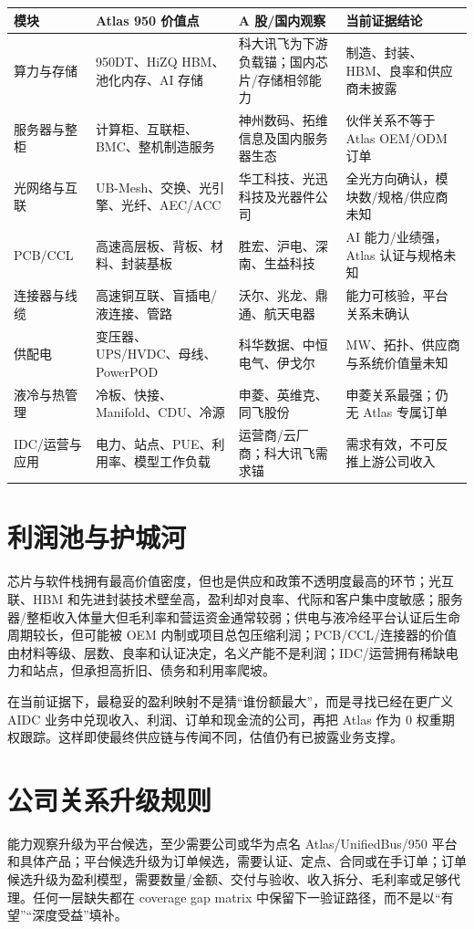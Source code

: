 \begin{exhibitbox}
\begin{longtable}{L{2.8cm}L{3.5cm}L{4.0cm}L{3.0cm}}
\toprule
\textbf{模块} & \textbf{Atlas 950 价值点} & \textbf{A 股/国内观察} & \textbf{当前证据结论}\\
\midrule
\endhead
算力与存储 & 950DT、HiZQ HBM、池化内存、AI 存储 & 科大讯飞为下游负载锚；国内芯片/存储相邻能力 & 制造、封装、HBM、良率和供应商未披露\\
服务器与整柜 & 计算柜、互联柜、BMC、整机制造服务 & 神州数码、拓维信息及国内服务器生态 & 伙伴关系不等于 Atlas OEM/ODM 订单\\
光网络与互联 & UB-Mesh、交换、光引擎、光纤、AEC/ACC & 华工科技、光迅科技及光器件公司 & 全光方向确认，模块数/规格/供应商未知\\
PCB/CCL & 高速高层板、背板、材料、封装基板 & 胜宏、沪电、深南、生益科技 & AI 能力/业绩强，Atlas 认证与规格未知\\
连接器与线缆 & 高速铜互联、盲插电/液连接、管路 & 沃尔、兆龙、鼎通、航天电器 & 能力可核验，平台关系未确认\\
供配电 & 变压器、UPS/HVDC、母线、PowerPOD & 科华数据、中恒电气、伊戈尔 & MW、拓扑、供应商与系统价值量未知\\
液冷与热管理 & 冷板、快接、Manifold、CDU、冷源 & 申菱、英维克、同飞股份 & 申菱关系最强；仍无 Atlas 专属订单\\
IDC/运营与应用 & 电力、站点、PUE、利用率、模型工作负载 & 运营商/云厂商；科大讯飞需求锚 & 需求有效，不可反推上游公司收入\\
\bottomrule
\end{longtable}
\end{exhibitbox}

\section{利润池与护城河}

芯片与软件栈拥有最高价值密度，但也是供应和政策不透明度最高的环节；光互联、HBM 和先进封装技术壁垒高，盈利却对良率、代际和客户集中度敏感；服务器/整柜收入体量大但毛利率和营运资金通常较弱；供电与液冷经平台认证后生命周期较长，但可能被 OEM 内制或项目总包压缩利润；PCB/CCL/连接器的价值由材料等级、层数、良率和认证决定，名义产能不是利润；IDC/运营拥有稀缺电力和站点，但承担高折旧、债务和利用率爬坡。

在当前证据下，最稳妥的盈利映射不是猜“谁份额最大”，而是寻找已经在更广义 AIDC 业务中兑现收入、利润、订单和现金流的公司，再把 Atlas 作为 0 权重期权跟踪。这样即使最终供应链与传闻不同，估值仍有已披露业务支撑。

\section{公司关系升级规则}

能力观察升级为平台候选，至少需要公司或华为点名 Atlas/UnifiedBus/950 平台和具体产品；平台候选升级为订单候选，需要认证、定点、合同或在手订单；订单候选升级为盈利模型，需要数量/金额、交付与验收、收入拆分、毛利率或足够代理。任何一层缺失都在 coverage gap matrix 中保留下一验证路径，而不是以“有望”“深度受益”填补。
